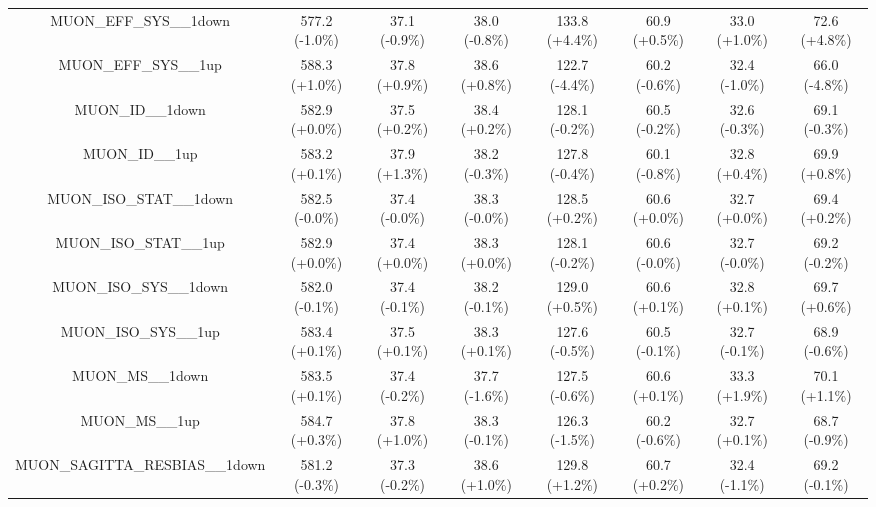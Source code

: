 \begin{table}[htbp!]
\begin{tiny}
\begin{center}
\begin{tabular}{c|c|c|c||c|c|c|c}
MUON\_EFF\_SYS\_\_1down                                      & 577.2     (-1.0\%) & 37.1      (-0.9\%) & 38.0      (-0.8\%) & 133.8     (+4.4\%) & 60.9      (+0.5\%) & 33.0      (+1.0\%) & 72.6      (+4.8\%) \\ 
MUON\_EFF\_SYS\_\_1up                                        & 588.3     (+1.0\%) & 37.8      (+0.9\%) & 38.6      (+0.8\%) & 122.7     (-4.4\%) & 60.2      (-0.6\%) & 32.4      (-1.0\%) & 66.0      (-4.8\%) \\ 
MUON\_ID\_\_1down                                            & 582.9     (+0.0\%) & 37.5      (+0.2\%) & 38.4      (+0.2\%) & 128.1     (-0.2\%) & 60.5      (-0.2\%) & 32.6      (-0.3\%) & 69.1      (-0.3\%) \\ 
MUON\_ID\_\_1up                                              & 583.2     (+0.1\%) & 37.9      (+1.3\%) & 38.2      (-0.3\%) & 127.8     (-0.4\%) & 60.1      (-0.8\%) & 32.8      (+0.4\%) & 69.9      (+0.8\%) \\ 
MUON\_ISO\_STAT\_\_1down                                     & 582.5     (-0.0\%) & 37.4      (-0.0\%) & 38.3      (-0.0\%) & 128.5     (+0.2\%) & 60.6      (+0.0\%) & 32.7      (+0.0\%) & 69.4      (+0.2\%) \\ 
MUON\_ISO\_STAT\_\_1up                                       & 582.9     (+0.0\%) & 37.4      (+0.0\%) & 38.3      (+0.0\%) & 128.1     (-0.2\%) & 60.6      (-0.0\%) & 32.7      (-0.0\%) & 69.2      (-0.2\%) \\ 
MUON\_ISO\_SYS\_\_1down                                      & 582.0     (-0.1\%) & 37.4      (-0.1\%) & 38.2      (-0.1\%) & 129.0     (+0.5\%) & 60.6      (+0.1\%) & 32.8      (+0.1\%) & 69.7      (+0.6\%) \\ 
MUON\_ISO\_SYS\_\_1up                                        & 583.4     (+0.1\%) & 37.5      (+0.1\%) & 38.3      (+0.1\%) & 127.6     (-0.5\%) & 60.5      (-0.1\%) & 32.7      (-0.1\%) & 68.9      (-0.6\%) \\ 
MUON\_MS\_\_1down                                            & 583.5     (+0.1\%) & 37.4      (-0.2\%) & 37.7      (-1.6\%) & 127.5     (-0.6\%) & 60.6      (+0.1\%) & 33.3      (+1.9\%) & 70.1      (+1.1\%) \\ 
MUON\_MS\_\_1up                                              & 584.7     (+0.3\%) & 37.8      (+1.0\%) & 38.3      (-0.1\%) & 126.3     (-1.5\%) & 60.2      (-0.6\%) & 32.7      (+0.1\%) & 68.7      (-0.9\%) \\ 
MUON\_SAGITTA\_RESBIAS\_\_1down                              & 581.2     (-0.3\%) & 37.3      (-0.2\%) & 38.6      (+1.0\%) & 129.8     (+1.2\%) & 60.7      (+0.2\%) & 32.4      (-1.1\%) & 69.2      (-0.1\%) \\ 

\end{tabular}
\end{center}
\end{tiny}
\end{table}
